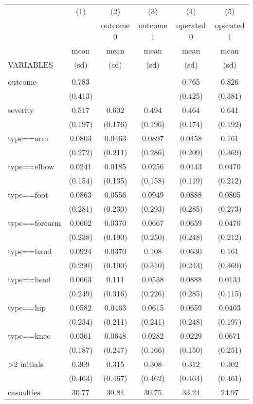 \begin{tabular}{lccccc} \hline
 & (1) & (2) & (3) & (4) & (5) \\
 &  & outcome 0 & outcome 1 & operated 0 & operated 1 \\
 & mean & mean & mean & mean & mean \\
VARIABLES & (sd) & (sd) & (sd) & (sd) & (sd) \\ \hline
 &  &  &  &  &  \\
outcome & 0.783 &  &  & 0.765 & 0.826 \\
 & (0.413) &  &  & (0.425) & (0.381) \\
severity & 0.517 & 0.602 & 0.494 & 0.464 & 0.641 \\
 & (0.197) & (0.176) & (0.196) & (0.174) & (0.192) \\
type==arm & 0.0803 & 0.0463 & 0.0897 & 0.0458 & 0.161 \\
 & (0.272) & (0.211) & (0.286) & (0.209) & (0.369) \\
type==elbow & 0.0241 & 0.0185 & 0.0256 & 0.0143 & 0.0470 \\
 & (0.154) & (0.135) & (0.158) & (0.119) & (0.212) \\
type==foot & 0.0863 & 0.0556 & 0.0949 & 0.0888 & 0.0805 \\
 & (0.281) & (0.230) & (0.293) & (0.285) & (0.273) \\
type==forearm & 0.0602 & 0.0370 & 0.0667 & 0.0659 & 0.0470 \\
 & (0.238) & (0.190) & (0.250) & (0.248) & (0.212) \\
type==hand & 0.0924 & 0.0370 & 0.108 & 0.0630 & 0.161 \\
 & (0.290) & (0.190) & (0.310) & (0.243) & (0.369) \\
type==head & 0.0663 & 0.111 & 0.0538 & 0.0888 & 0.0134 \\
 & (0.249) & (0.316) & (0.226) & (0.285) & (0.115) \\
type==hip & 0.0582 & 0.0463 & 0.0615 & 0.0659 & 0.0403 \\
 & (0.234) & (0.211) & (0.241) & (0.248) & (0.197) \\
type==knee & 0.0361 & 0.0648 & 0.0282 & 0.0229 & 0.0671 \\
 & (0.187) & (0.247) & (0.166) & (0.150) & (0.251) \\
>2 initials & 0.309 & 0.315 & 0.308 & 0.312 & 0.302 \\
 & (0.463) & (0.467) & (0.462) & (0.464) & (0.461) \\
casualties & 30.77 & 30.84 & 30.75 & 33.24 & 24.97 \\

\end{tabular}
